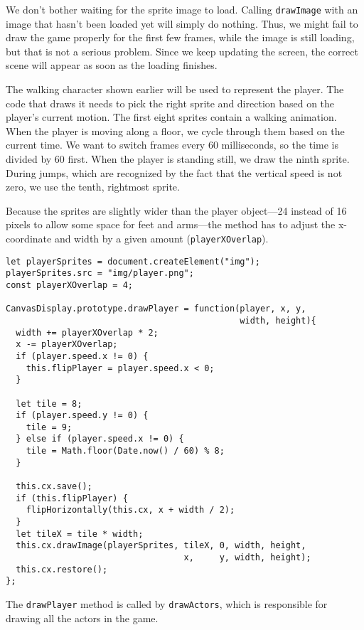 We don't bother waiting for the sprite image to load. Calling \lstinline`drawImage` with an image that hasn't been loaded yet will simply do nothing. Thus, we might fail to draw the game properly for the first few frames, while the image is still loading, but that is not a serious problem. Since we keep updating the screen, the correct scene will appear as soon as the loading finishes.

The walking character shown earlier will be used to represent the player. The code that draws it needs to pick the right sprite and direction based on the player's current motion. The first eight sprites contain a walking animation. When the player is moving along a floor, we cycle through them based on the current time. We want to switch frames every 60 milliseconds, so the time is divided by 60 first. When the player is standing still, we draw the ninth sprite. During jumps, which are recognized by the fact that the vertical speed is not zero, we use the tenth, rightmost sprite.

Because the sprites are slightly wider than the player object—24 instead of 16 pixels to allow some space for feet and arms—the method has to adjust the x-coordinate and width by a given amount (\lstinline`playerXOverlap`).

\begin{lstlisting}
let playerSprites = document.createElement("img");
playerSprites.src = "img/player.png";
const playerXOverlap = 4;

CanvasDisplay.prototype.drawPlayer = function(player, x, y,
                                              width, height){
  width += playerXOverlap * 2;
  x -= playerXOverlap;
  if (player.speed.x != 0) {
    this.flipPlayer = player.speed.x < 0;
  }

  let tile = 8;
  if (player.speed.y != 0) {
    tile = 9;
  } else if (player.speed.x != 0) {
    tile = Math.floor(Date.now() / 60) % 8;
  }

  this.cx.save();
  if (this.flipPlayer) {
    flipHorizontally(this.cx, x + width / 2);
  }
  let tileX = tile * width;
  this.cx.drawImage(playerSprites, tileX, 0, width, height,
                                   x,     y, width, height);
  this.cx.restore();
};
\end{lstlisting}
\noindent

The \lstinline`drawPlayer` method is called by \lstinline`drawActors`, which is responsible for drawing all the actors in the game.

